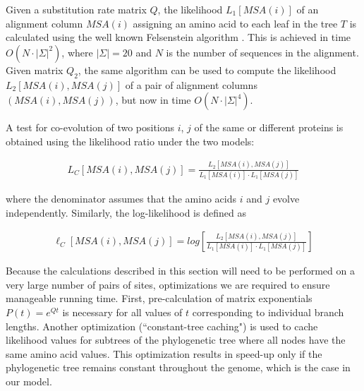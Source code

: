 Given a substitution rate matrix $Q$, the likelihood $L_1[MSA(i)]$ of an alignment column $MSA(i)$ assigning an amino acid to each leaf in the tree $T$ is calculated using the well known Felsenstein algorithm \cite{felsenstein2004inferring}. This is achieved in time $O(N \cdot |\Sigma|^2)$, where $|\Sigma|=20$ and $N$ is the number of sequences in the alignment. Given matrix $Q_2$, the same algorithm can be used to compute the likelihood $L_2[ MSA(i), MSA(j) ]$ of a pair of alignment columns $( MSA(i), MSA(j) )$, but now in time $O(N \cdot |\Sigma|^4)$. 

A test for co-evolution of two positions $i$, $j$ of the same or different proteins is obtained using the likelihood ratio under the two models: 

\begin{eqnarray*}
	L_C[MSA(i), MSA(j)] = \frac{L_2[ MSA(i), MSA(j) ]}{L_1[MSA(i)] \cdot L_1[MSA(j)]}
\end{eqnarray*}

\noindent where the denominator assumes that the amino acids $i$ and $j$ evolve independently. Similarly, the log-likelihood is defined as

\begin{eqnarray}
    \ell_C[MSA(i), MSA(j)] = log \left[ \frac{L_2[ MSA(i), MSA(j) ]}{L_1[MSA(i)] \cdot L_1[MSA(j)]} \right]
\end{eqnarray}

Because the calculations described in this section will need to be performed on a very large number of pairs of sites, optimizations we are required to ensure manageable running time. First, pre-calculation of  matrix exponentials $P(t) = e^{Qt}$ is necessary for all values of $t$ corresponding to individual branch lengths. Another optimization (``constant-tree caching") is used to cache likelihood values for subtrees of the phylogenetic tree where all nodes have the same amino acid values. This optimization results in speed-up only if the phylogenetic tree remains constant throughout the genome, which is the case in our model.

